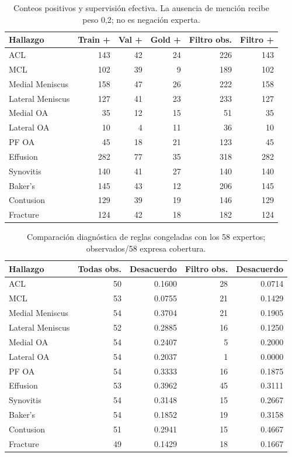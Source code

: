 \begin{table}[ht]
\centering\small
\caption{Conteos positivos y supervisión efectiva. La ausencia de mención recibe peso 0,2; no es negación experta.}
\begin{tabular}{lrrrrr}
\toprule
Hallazgo & Train + & Val + & Gold + & Filtro obs. & Filtro + \\
\midrule
ACL & 143 & 42 & 24 & 226 & 143 \\
MCL & 102 & 39 & 9 & 189 & 102 \\
Medial Meniscus & 158 & 47 & 26 & 222 & 158 \\
Lateral Meniscus & 127 & 41 & 23 & 233 & 127 \\
Medial OA & 35 & 12 & 15 & 51 & 35 \\
Lateral OA & 10 & 4 & 11 & 36 & 10 \\
PF OA & 45 & 18 & 21 & 123 & 45 \\
Effusion & 282 & 77 & 35 & 318 & 282 \\
Synovitis & 140 & 41 & 27 & 140 & 140 \\
Baker's & 145 & 43 & 12 & 206 & 145 \\
Contusion & 129 & 39 & 19 & 146 & 129 \\
Fracture & 124 & 42 & 18 & 182 & 124 \\
\bottomrule
\end{tabular}
\end{table}
\begin{table}[ht]
\centering\small
\caption{Comparación diagnóstica de reglas congeladas con los 58 expertos; observados/58 expresa cobertura.}
\begin{tabular}{lrrrr}
\toprule
Hallazgo & Todas obs. & Desacuerdo & Filtro obs. & Desacuerdo \\
\midrule
ACL & 50 & 0.1600 & 28 & 0.0714 \\
MCL & 53 & 0.0755 & 21 & 0.1429 \\
Medial Meniscus & 54 & 0.3704 & 21 & 0.1905 \\
Lateral Meniscus & 52 & 0.2885 & 16 & 0.1250 \\
Medial OA & 54 & 0.2407 & 5 & 0.2000 \\
Lateral OA & 54 & 0.2037 & 1 & 0.0000 \\
PF OA & 54 & 0.3333 & 16 & 0.1875 \\
Effusion & 53 & 0.3962 & 45 & 0.3111 \\
Synovitis & 54 & 0.3148 & 15 & 0.2667 \\
Baker's & 54 & 0.1852 & 19 & 0.3158 \\
Contusion & 51 & 0.2941 & 15 & 0.4667 \\
Fracture & 49 & 0.1429 & 18 & 0.1667 \\
\bottomrule
\end{tabular}
\end{table}
